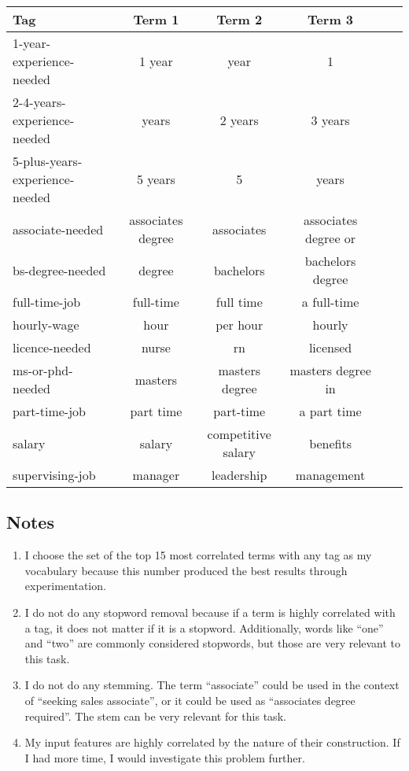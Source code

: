 \documentclass{article}
\begin{document}
\begin{center}
	\begin{tabular}{ | l | c | c | c | c | c | }
		\hline
		\textbf{Tag} & \textbf{Term 1} & \textbf{Term 2} & \textbf{Term 3} \\ \hline
		1-year-experience-needed & 1 year & year & 1 \\
		2-4-years-experience-needed & years & 2 years & 3 years \\
		5-plus-years-experience-needed & 5 years & 5 & years \\
		associate-needed & associates degree & associates & associates degree or \\
		bs-degree-needed & degree & bachelors & bachelors degree \\
		full-time-job & full-time & full time & a full-time \\
		hourly-wage & hour & per hour & hourly \\
		licence-needed & nurse & rn & licensed \\
		ms-or-phd-needed & masters & masters degree & masters degree in \\
		part-time-job & part time & part-time & a part time \\
		salary & salary & competitive salary & benefits \\
		supervising-job & manager & leadership & management \\
		\hline
	\end{tabular}
\end{center}

\subsection{Notes}

\begin{enumerate}
	\item I choose the set of the top 15 most correlated terms with any tag as my vocabulary because this number produced the best results through experimentation.
	\item I do not do any stopword removal because if a term is highly correlated with a tag, it does not matter if it is a stopword. Additionally, words like ``one'' and ``two'' are commonly considered stopwords, but those are very relevant to this task. 
	\item I do not do any stemming. The term ``associate'' could be used in the context of ``seeking sales associate'', or it could be used as ``associates degree required''. The stem can be very relevant for this task.
	\item My input features are highly correlated by the nature of their construction. If I had more time, I would investigate this problem further.
\end{enumerate}
\end{document}

